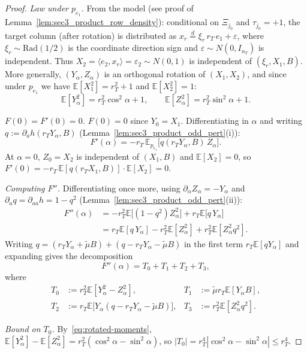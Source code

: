 \documentclass[10pt]{article}
\newcommand{\Ebb}{\mathbb E}
\newcommand{\ip}[2]{\langle #1,#2\rangle}
\newcommand{\trg}{T}
\newcommand{\nT}{n_{\trg}}
\begin{document}
\begin{proof}
\textit{Law under $p_{e_1}$.}
From the model (see proof of Lemma~\ref{lem:sec3_product_row_density}):
conditional on $\Xi_{j_0}$ and $\tau_{j_0}=+1$, the target column (after rotation) is distributed as
$x_r \overset{d}{=} \xi_r\,r_T\,e_1+\varepsilon$, where $\xi_r\sim\mathrm{Rad}(1/2)$
is the coordinate direction sign and $\varepsilon\sim N(0,I_{\nT})$ is independent.
Thus $X_2=\ip{e_2}{x_r}=\varepsilon_2\sim N(0,1)$ is independent of $(\xi_r,X_1,B)$.
More generally, $(Y_\alpha,Z_\alpha)$ is an orthogonal rotation of $(X_1,X_2)$, and
since under $p_{e_1}$ we have $\Ebb[X_1^2]=r_T^2+1$ and $\Ebb[X_2^2]=1$:
\begin{equation}\label{eq:rotated-moments}
    \Ebb[Y_\alpha^2]=r_T^2\cos^2\alpha+1, \qquad \Ebb[Z_\alpha^2]=r_T^2\sin^2\alpha+1.
\end{equation}

\textit{$F(0)=F'(0)=0$.}
$F(0)=0$ since $Y_0=X_1$.  Differentiating in $\alpha$ and writing
$q:=\partial_a h(r_T Y_\alpha,B)$ (Lemma~\ref{lem:sec3_product_odd_pert}(i)):
\[
    F'(\alpha) = -r_T\,\Ebb_{p_{e_1}}\!\bigl[q(r_T Y_\alpha,B)\,Z_\alpha\bigr].
\]
At $\alpha=0$, $Z_0=X_2$ is independent of $(X_1,B)$ and $\Ebb[X_2]=0$,
so $F'(0)=-r_T\,\Ebb[q(r_T X_1,B)]\cdot\Ebb[X_2]=0$.

\textit{Computing $F''$.}
Differentiating once more, using $\partial_\alpha Z_\alpha=-Y_\alpha$ and
$\partial_a q=\partial_{aa}h=1-q^2$ (Lemma~\ref{lem:sec3_product_odd_pert}(ii)):
\begin{align*}
    F''(\alpha)
    &=
    -r_T^2\Ebb\!\bigl[(1-q^2)Z_\alpha^2\bigr]
    +
    r_T\Ebb\!\bigl[q\,Y_\alpha\bigr]\\
    &=
    r_T\Ebb[q\,Y_\alpha]
    -r_T^2\Ebb[Z_\alpha^2]
    +r_T^2\Ebb[Z_\alpha^2 q^2].
\end{align*}
Writing $q = (r_T Y_\alpha+\tilde\mu B)+(q-r_T Y_\alpha-\tilde\mu B)$
in the first term $r_T\Ebb[qY_\alpha]$ and expanding gives the decomposition
\[
    F''(\alpha) = T_0+T_1+T_2+T_3,
\]
where
\begin{align*}
    T_0 &:= r_T^2\Ebb[Y_\alpha^2-Z_\alpha^2], &
    T_1 &:= \tilde\mu r_T\Ebb[Y_\alpha B], \\
    T_2 &:= r_T\Ebb\!\bigl[Y_\alpha(q-r_T Y_\alpha-\tilde\mu B)\bigr], &
    T_3 &:= r_T^2\Ebb[Z_\alpha^2 q^2].
\end{align*}

\textit{Bound on $T_0$.}
By~\eqref{eq:rotated-moments},
$\Ebb[Y_\alpha^2]-\Ebb[Z_\alpha^2]=r_T^2(\cos^2\alpha-\sin^2\alpha)$,
so $|T_0|=r_T^4|\cos^2\alpha-\sin^2\alpha|\le r_T^4$.


\end{proof}
\end{document}
